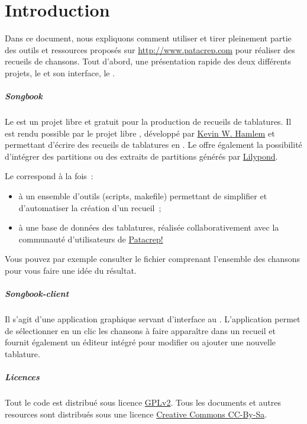\chapter*{Introduction}
\minitoc
\label{chap:introduction}

Dans ce document, nous expliquons comment utiliser et tirer pleinement
partie des outils et ressources proposés sur
\url{http://www.patacrep.com} pour réaliser des recueils de
chansons. Tout d'abord, une présentation rapide des deux différents
projets, le \recueil et son interface, le \client.

\paragraph{Songbook}
Le \recueil est un projet libre et gratuit pour la production de
recueils de tablatures. Il est rendu possible par le projet libre
\songs, développé par \href{http://www.utdallas.edu/~hamlen}{Kevin
  W. Hamlem} et permettant d'écrire des recueils de tablatures en
\latex. Le \recueil offre également la possibilité d'intégrer des
partitions ou des extraits de partitions générés par
\href{http://lilypond.org}{Lilypond}.

Le \recueil correspond à la fois~:
\begin{itemize}
\item à un ensemble d'outils (scripts, makefile) permettant de
  simplifier et d'automatiser la création d'un recueil~;
\item à une base de données des tablatures, réalisée collaborativement
  avec la communauté d'utilisateurs de
  \href{http://www.patacrep.com}{Patacrep!}
\end{itemize}

Vous pouvez par exemple consulter le fichier
\href{http://www.patacrep.com/data/documents/songbook.pdf}{}
comprenant l'ensemble des chansons pour vous faire une idée du
résultat.

\paragraph{Songbook-client}
Il s'agit d'une application graphique servant d'interface au
\recueil. L'application permet de sélectionner en un clic les chansons
à faire apparaître dans un recueil et fournit également un éditeur
intégré pour modifier ou ajouter une nouvelle tablature.

\paragraph{Licences}
Tout le code est distribué sous licence
\href{http://www.gnu.org/licenses/gpl.html}{GPLv2}. Tous les documents
et autres resources sont distribués sous une licence
\href{http://creativecommons.org/}{Creative Commons CC-By-Sa}.
